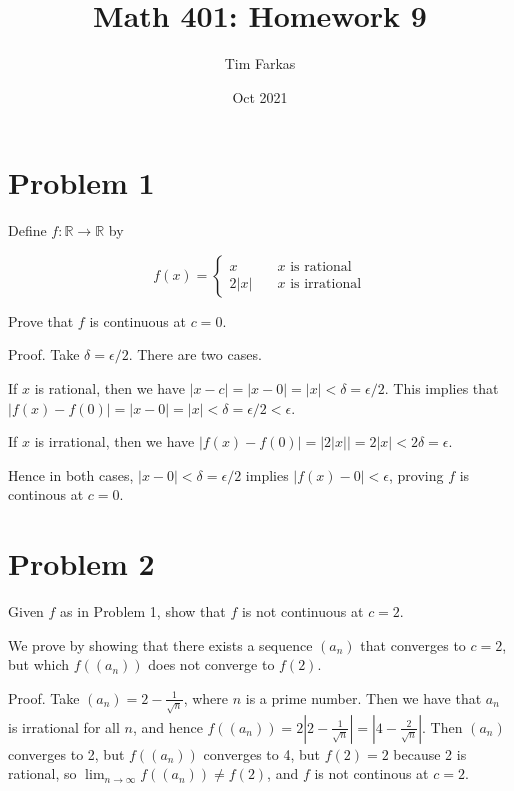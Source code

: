 \documentclass{article}
\title{Math 401: Homework 9}
\author{Tim Farkas}
\date{Oct 2021}
\begin{document}
\maketitle

\section*{Problem 1}

Define $f: \mathbb{R} \rightarrow \mathbb{R}$ by 

\begin{equation*}
        f(x) = \left\{
\begin{array}{ll}
        x &\quad \text{$x$ is rational} \\
        2\left|x\right| &\quad \text{$x$ is irrational}
\end{array}\right.
\end{equation*}

Prove that $f$ is continuous at $c = 0$. 

Proof. Take $\delta = \epsilon/2$. There are two cases. 

If $x$ is rational, then we have $\left|x - c\right| = \left|x - 0\right| = \left|x\right| < \delta = \epsilon/2$. 
This implies that $\left|f(x) - f(0)\right| = \left|x - 0\right| = \left|x\right| < \delta = \epsilon/2 < \epsilon$. 

If $x$ is irrational, then we have $\left|f(x) - f(0)\right| = \left|2\left|x\right|\right| = 2\left|x\right| < 2\delta = \epsilon$. 

Hence in both cases, $\left|x - 0\right| < \delta = \epsilon/2$ implies $\left|f(x) - 0\right| < \epsilon$, proving $f$ is continous at $c = 0$. 

\section*{Problem 2}

Given $f$ as in Problem 1, show that $f$ is not continuous at $c = 2$. 

We prove by showing that there exists a sequence $(a_n)$ that converges to $c = 2$, but which $f((a_n))$ does not converge to $f(2)$. 

Proof. Take $(a_n) = 2 - \frac{1}{\sqrt{n}}$, where $n$ is a prime number. Then we have that $a_n$ is irrational for all $n$, and hence $f((a_n)) = 2\left|2 - \frac{1}{\sqrt{n}}\right| = \left|4 - \frac{2}{\sqrt{n}}\right|$. 
Then $(a_n)$ converges to 2, but $f((a_n))$ converges to 4, but $f(2) = 2$ because 2 is rational, so $\lim_{n \rightarrow \infty} f((a_n)) \neq f(2)$, and $f$ is not continous at $c = 2$. 
\end{document}
